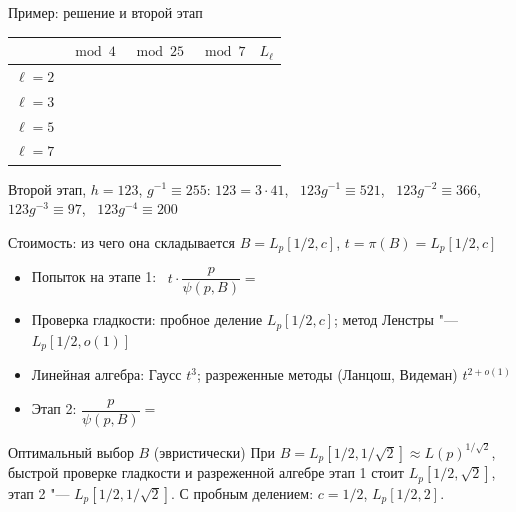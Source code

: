 \documentclass{ca-slides}
\begin{document}
\begin{canvasframe}{Пример: решение и второй этап}
  \small
  \begin{center}
  \begin{tabular}{c|ccc|r}
    & $\bmod 4$ & $\bmod 25$ & $\bmod 7$ & $L_\ell$ \\ \hline
    $\ell = 2$ & & & & \\
    $\ell = 3$ & & & & \\
    $\ell = 5$ & & & & \\
    $\ell = 7$ & & & &
  \end{tabular}
  \end{center}
  Второй этап, $h = 123$, $g^{-1} \equiv 255$: \quad
  $123 = 3 \cdot 41$, \ $123g^{-1} \equiv 521$, \ $123g^{-2} \equiv 366$, \ $123g^{-3} \equiv 97$,
  \ $123 g^{-4} \equiv 200$
  \penspace[0.15\textheight]
\end{canvasframe}

\begin{canvasframe}{Стоимость: из чего она складывается}
  $B = L_p[1/2, c]$, \quad $t = \pi(B) = L_p[1/2, c]$
  \begin{itemize}
    \item Попыток на этапе 1: \ $t \cdot \dfrac{p}{\psi(p, B)} = $ \penspace[0.04\textheight]
    \item Проверка гладкости: пробное деление $L_p[1/2, c]$; метод Ленстры "--- $L_p[1/2, o(1)]$
    \item Линейная алгебра: Гаусс $t^3$; разреженные методы (Ланцош, Видеман) $t^{2 + o(1)}$
    \item Этап 2: $\dfrac{p}{\psi(p, B)} = $
  \end{itemize}
\end{canvasframe}

\begin{theoremframe}{Оптимальный выбор $B$ (эвристически)}
  При $B = L_p[1/2, 1/\sqrt 2] \approx L(p)^{1/\sqrt 2}$, быстрой проверке гладкости и разреженной
  алгебре этап 1 стоит $L_p[1/2, \sqrt 2]$, этап 2 "--- $L_p[1/2, 1/\sqrt 2]$.
  С пробным делением: $c = 1/2$, $L_p[1/2, 2]$.
\end{theoremframe}
\end{document}
